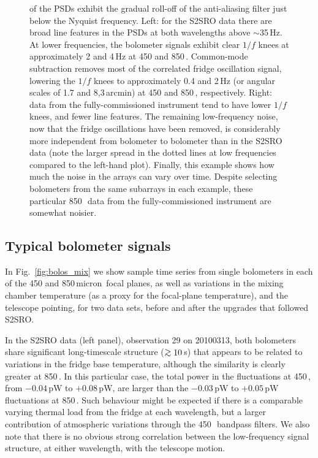 \documentclass[useAMS,usenatbib,nofootinbib]{mn2e}
\def\gsim{\mathrel{\lower2.5pt\vbox{\lineskip=0pt\baselineskip=0pt
          \hbox{$>$}\hbox{$\sim$}}}}
\begin{document}
\begin{figure}
{  of the PSDs exhibit the gradual roll-off of the anti-aliasing filter
  just below the Nyquist frequency.  Left: for the S2SRO data there
  are broad line features in the PSDs at both wavelengths above
  $\sim$35\,Hz.  At lower frequencies, the bolometer signals exhibit
  clear $1/f$ knees at approximately 2 and 4\,Hz at 450 and
  850\,\micron. Common-mode subtraction removes most of the correlated
  fridge oscillation signal, lowering the $1/f$ knees to approximately
  0.4 and 2\,Hz (or angular scales of 1.7 and 8,3\,arcmin) at 450 and
  850\,\micron, respectively. Right: data from the fully-commissioned
  instrument tend to have lower $1/f$ knees, and fewer line
  features. The remaining low-frequency noise, now that the fridge
  oscillations have been removed, is considerably more independent
  from bolometer to bolometer than in the S2SRO data (note the larger
  spread in the dotted lines at low frequencies compared to the
  left-hand plot). Finally, this example shows how much the noise in
  the arrays can vary over time. Despite selecting bolometers from the
  same subarrays in each example, these particular 850\,\micron\ data
  from the fully-commissioned instrument are somewhat noisier.}
\label{fig:pspec}
\end{figure}


\subsection{Typical bolometer signals}
\label{sec:bolosignal}

In Fig.~\ref{fig:bolos_mix} we show sample time series from single
bolometers in each of the 450 and 850\,micron\ focal planes, as well
as variations in the mixing chamber temperature (as a proxy for the
focal-plane temperature), and the telescope pointing, for two data
sets, before and after the upgrades that followed S2SRO.

In the S2SRO data (left panel), observation 29 on 20100313, both
bolometers share significant long-timescale structure ($\gsim10$\,s)
that appears to be related to variations in the fridge base
temperature, although the similarity is clearly greater at
850\,\micron. In this particular case, the total power in the
fluctuations at 450\,\micron, from $-0.04$\,pW to $+0.08$\,pW, are
larger than the $-0.03$\,pW to $+0.05$\,pW fluctuations at
850\,\micron. Such behaviour might be expected if there is a
comparable varying thermal load from the fridge at each wavelength,
but a larger contribution of atmospheric variations through the
450\,\micron\ bandpass filters. We also note that there is no obvious
strong correlation between the low-frequency signal structure, at
either wavelength, with the telescope motion.
\end{document}
